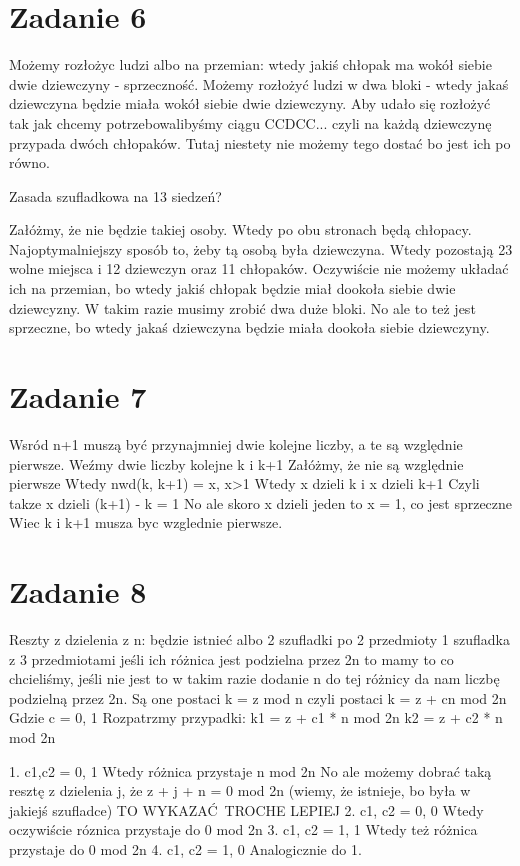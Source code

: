 \documentclass[12pt]{article}
\begin{document}
\section{Zadanie 6}
Możemy rozłożyc ludzi albo na przemian: wtedy jakiś chłopak ma wokół siebie dwie dziewczyny - sprzeczność.
Możemy rozłożyć ludzi w dwa bloki - wtedy jakaś dziewczyna będzie miała wokół siebie dwie dziewczyny. 
Aby udało się rozłożyć tak jak chcemy potrzebowalibyśmy ciągu CCDCC... czyli na każdą dziewczynę przypada dwóch chłopaków. Tutaj niestety nie możemy tego dostać bo jest ich po równo.

Zasada szufladkowa na 13 siedzeń?

Załóżmy, że nie będzie takiej osoby. Wtedy po obu stronach będą chłopacy. Najoptymalniejszy sposób to, żeby tą osobą była dziewczyna. Wtedy pozostają 23 wolne miejsca i 12 dziewczyn oraz 11 chłopaków. Oczywiście nie możemy układać ich na przemian, bo wtedy jakiś chłopak będzie miał dookoła siebie dwie dziewcyzny. W takim razie musimy zrobić dwa duże bloki. No ale to też jest sprzeczne, bo wtedy jakaś dziewczyna będzie miała dookoła siebie dziewczyny. 
\section{Zadanie 7}
Wsród n+1 muszą być przynajmniej dwie kolejne liczby, a te są względnie pierwsze.
Weźmy dwie liczby kolejne k i k+1 
Załóżmy, że nie są względnie pierwsze 
Wtedy nwd(k, k+1) = x, x>1
Wtedy x dzieli k i x dzieli k+1 
Czyli takze x dzieli (k+1) - k = 1
No ale skoro x dzieli jeden to x = 1, co jest sprzeczne
Wiec k i k+1 musza byc wzglednie pierwsze. 

\section{Zadanie 8}

Reszty z dzielenia z n:
będzie istnieć albo
2 szufladki po 2 przedmioty 
1 szufladka z 3 przedmiotami 
jeśli ich różnica jest podzielna przez 2n to mamy to co chcieliśmy, jeśli nie jest to w takim razie dodanie n do tej różnicy da nam liczbę podzielną przez 2n.
Są one postaci k = z mod n 
czyli postaci k = z + cn mod 2n
Gdzie c = {0, 1}
Rozpatrzmy przypadki:
k1 = z + c1 * n mod 2n
k2 = z + c2 * n mod 2n 

1. c1,c2 = 0, 1
Wtedy różnica przystaje n mod 2n 
No ale możemy dobrać taką resztę z dzielenia j, że z + j + n = 0 mod 2n (wiemy, że istnieje, bo była w jakiejś szufladce)
TO WYKAZAĆ TROCHE LEPIEJ
2. c1, c2 = 0, 0
Wtedy oczywiście róznica przystaje do 0 mod 2n
3. c1, c2 = 1, 1
Wtedy też różnica przystaje do 0 mod 2n
4. c1, c2 = 1, 0
Analogicznie do 1. 
\end{document}
